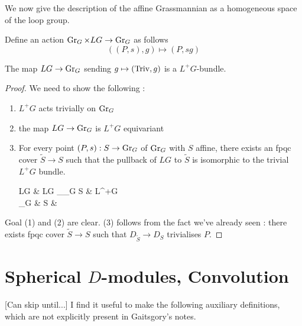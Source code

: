 \documentclass{article}
\begin{document}
We now give the description of the affine Grassmannian as
a homogeneous space of the loop group.

\begin{dfn}
  
  Define an action $\operatorname{Gr}_G \times LG \to \operatorname{Gr}_G$ as follows
  \[
    ((P , s) , g) \mapsto (P , s g)
  \]
\end{dfn}

\begin{prop}
  
  The map $LG \to \operatorname{Gr}_G$ sending $g \mapsto (\mathrm{Triv} , g)$
  is a $L^+G$-bundle.
\end{prop}
\begin{proof}
  
  We need to show the following : 
  \begin{enumerate}
    \item $L^+G$ acts trivially on $\operatorname{Gr}_G$
    \item the map $LG \to \operatorname{Gr}_G$ is $L^+G$ equivariant
    \item For every point $(P , s) : S \to \operatorname{Gr}_G$ of $\operatorname{Gr}_G$ with $S$ affine,
    there exists an fpqc cover $\tilde{S} \to S$ such that 
    the pullback of $LG$ to $\tilde{S}$ is isomorphic to 
    the trivial $L^+G$ bundle.
    \begin{cd}
    	LG & {LG \times_{\GR_G} S} & { \times L^+G} \\
	{\GR_G} & S & {}
	\arrow[from=1-1, to=2-1]
	\arrow["{(P ,s)}", from=2-2, to=2-1]
	\arrow["{\text{fpqc}}", from=2-3, to=2-2]
	\arrow[from=1-2, to=1-1]
	\arrow[from=1-2, to=2-2]
	\arrow["\lrcorner"{anchor=center, pos=0.125, rotate=-90}, draw=none, from=1-2, to=2-1]
	\arrow[from=1-3, to=1-2]
	\arrow[from=1-3, to=2-3]
	\arrow["\lrcorner"{anchor=center, pos=0.125, rotate=-90}, draw=none, from=1-3, to=2-2]
    \end{cd}
  \end{enumerate}
  Goal (1) and (2) are clear.
  (3) follows from the fact we've already seen : 
  there exists fpqc cover $\tilde{S} \to S$
  such that $D_{\tilde{S}} \to D_S$ trivialises $P$.

\end{proof}

\section{Spherical $D$-modules, Convolution}

[Can skip until...]
I find it useful to make the following auxiliary definitions,
which are not explicitly present in Gaitsgory's notes.
\end{document}
